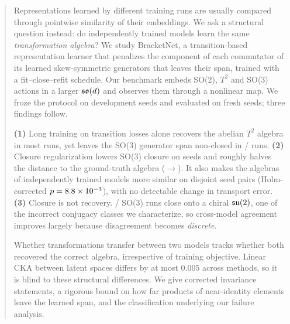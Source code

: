 \begin{abstract}
Representations learned by different training runs are usually compared through pointwise similarity of their
embeddings. We ask a structural question instead: do independently trained models learn the same
\emph{transformation algebra}? We study BracketNet, a transition-based representation learner that penalizes the
component of each commutator of its learned skew-symmetric generators that leaves their span, trained with a
fit--close--refit schedule. Our benchmark embeds SO(2), $T^2$ and SO(3) actions in a larger $\so(d)$ and
observes them through a nonlinear map. We froze the protocol on development seeds and evaluated on \NNseeds{}
fresh seeds; three findings follow.

\textbf{(1)} Long training on transition losses alone recovers the abelian $T^2$ algebra in most runs, yet leaves
the SO(3) generator span non-closed in \NSOthreeCompCatNonclosed/\NNseeds{} runs.
\textbf{(2)} Closure regularization lowers SO(3) closure on \NHoneSOthreeWins{} seeds and roughly halves the
distance to the ground-truth algebra (\NHtwoSOthreeMeanb{}$\to$\NHtwoSOthreeMeana). It also makes the algebras
of independently trained models more similar on disjoint seed pairs (Holm-corrected $p=\NHthreeSOthreeHolmp$),
with no detectable change in transport error.
\textbf{(3)} Closure is not recovery. \NSOthreeBNChiral/\NNseeds{} SO(3) runs close onto a chiral $\su(2)$, one
of the incorrect conjugacy classes we characterize, so cross-model agreement improves largely because
disagreement becomes \emph{discrete}.

Whether transformations transfer between two models tracks whether both recovered the correct algebra,
irrespective of training objective. Linear CKA between latent spaces differs by at most $0.005$ across methods, so it is blind to these structural differences. We give corrected invariance statements, a
rigorous bound on how far products of near-identity elements leave the learned span, and the classification
underlying our failure analysis.
\end{abstract}
